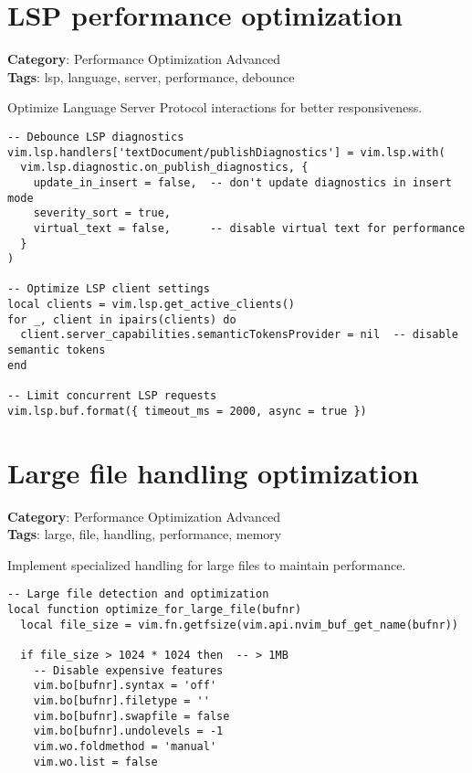 {{{{{{{{{{\section{LSP performance optimization}

\textbf{Category}: Performance Optimization Advanced\\ \textbf{Tags}: lsp, language, server, performance, debounce
\vspace{0.5cm}

Optimize Language Server Protocol interactions for better responsiveness.

\begin{Exa*}{}
\begin{Verbatim}[fontsize=\footnotesize, breaklines, breakanywhere]
-- Debounce LSP diagnostics
vim.lsp.handlers['textDocument/publishDiagnostics'] = vim.lsp.with(
  vim.lsp.diagnostic.on_publish_diagnostics, {
    update_in_insert = false,  -- don't update diagnostics in insert mode
    severity_sort = true,
    virtual_text = false,      -- disable virtual text for performance
  }
)

-- Optimize LSP client settings
local clients = vim.lsp.get_active_clients()
for _, client in ipairs(clients) do
  client.server_capabilities.semanticTokensProvider = nil  -- disable semantic tokens
end

-- Limit concurrent LSP requests
vim.lsp.buf.format({ timeout_ms = 2000, async = true })
\end{Verbatim}
\end{Exa*}

\section{Large file handling optimization}

\textbf{Category}: Performance Optimization Advanced\\ \textbf{Tags}: large, file, handling, performance, memory
\vspace{0.5cm}

Implement specialized handling for large files to maintain performance.

\begin{Exa*}{}
\begin{Verbatim}[fontsize=\footnotesize, breaklines, breakanywhere]
-- Large file detection and optimization
local function optimize_for_large_file(bufnr)
  local file_size = vim.fn.getfsize(vim.api.nvim_buf_get_name(bufnr))
  
  if file_size > 1024 * 1024 then  -- > 1MB
    -- Disable expensive features
    vim.bo[bufnr].syntax = 'off'
    vim.bo[bufnr].filetype = ''
    vim.bo[bufnr].swapfile = false
    vim.bo[bufnr].undolevels = -1
    vim.wo.foldmethod = 'manual'
    vim.wo.list = false
    

\end{Verbatim}
\end{Exa*}}}}}}}}}}}

